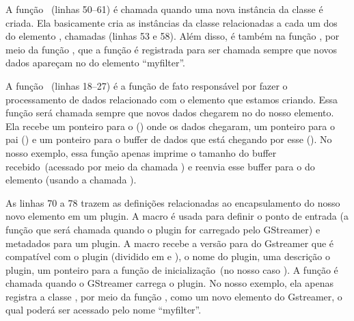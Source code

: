 A função ~(linhas 50--61) é chamada quando uma nova
instância da classe  é criada.  Ela basicamente cria as
instâncias da classe  relacionadas a cada um dos  do
elemento , chamadas  (linhas
53 e 58).  Além disso, é também na função , por meio da
função , que a função é registrada para ser
chamada sempre que novos dados apareçam no  do elemento
``myfilter''.

A função ~(linhas 18--27) é a função de fato responsável
por fazer o processamento de dados relacionado com o elemento que estamos
criando.  Essa função será chamada sempre que novos dados chegarem no
 do nosso elemento.  Ela recebe um ponteiro para o 
() onde os dados chegaram, um ponteiro para o pai () e
um ponteiro para o buffer de dados que está chegando por esse 
().  No nosso exemplo, essa função apenas imprime o tamanho do
buffer recebido~(acessado por meio da chamada ) e
reenvia esse buffer para o  do elemento (usando a chamada
).


As linhas 70 a 78 trazem as definições relacionadas ao encapsulamento do nosso
novo elemento em um plugin.  A macro  é usada para
definir o ponto de entrada (a função que será chamada quando o plugin for
carregado pelo GStreamer) e metadados para um plugin.  A macro recebe a versão
para do Gstreamer que é compatível com o  plugin (dividido em  e
), o nome do plugin, uma descrição o plugin, um ponteiro para a
função de inicialização~(no nosso caso ).  A função 
 é chamada quando o GStreamer carrega o plugin.  No
nosso exemplo, ela apenas registra a classe , por meio da função
, como um novo elemento do Gstreamer, o qual poderá ser
acessado pelo nome ``myfilter''.



